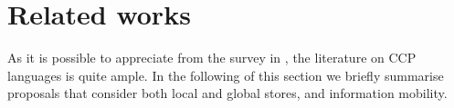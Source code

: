 \documentclass{llncs}
\begin{document}
%
%
%


\section{Related works}\label{sec:related}
As it is possible to appreciate from the survey in \cite{emerging}, the literature on CCP languages is quite ample. In the following of this section  we briefly summarise proposals that consider both local and global stores, and information mobility.
\end{document}
